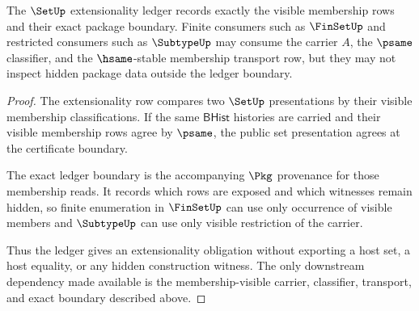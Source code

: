 \begin{theorem}
\label{thm:set-extensionality-ledger-obligation}
The $\SetUp$ extensionality ledger records exactly the visible membership rows and their exact package boundary. Finite consumers such as $\FinSetUp$ and restricted consumers such as $\SubtypeUp$ may consume the carrier $A$, the $\psame$ classifier, and the $\hsame$-stable membership transport row, but they may not inspect hidden package data outside the ledger boundary.
\end{theorem}
\begin{proof}
The extensionality row compares two $\SetUp$ presentations by their visible membership classifications. If the same $\mathsf{BHist}$ histories are carried and their visible membership rows agree by $\psame$, the public set presentation agrees at the certificate boundary.

The exact ledger boundary is the accompanying $\Pkg$ provenance for those membership reads. It records which rows are exposed and which witnesses remain hidden, so finite enumeration in $\FinSetUp$ can use only occurrence of visible members and $\SubtypeUp$ can use only visible restriction of the carrier.

Thus the ledger gives an extensionality obligation without exporting a host set, a host equality, or any hidden construction witness. The only downstream dependency made available is the membership-visible carrier, classifier, transport, and exact boundary described above.
\end{proof}

